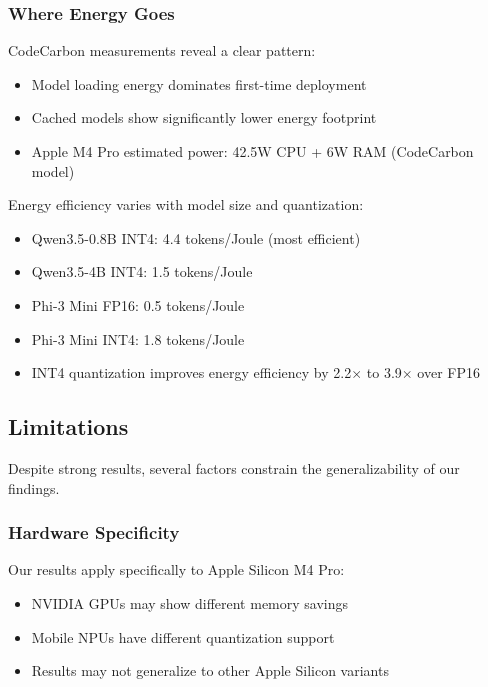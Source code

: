 \documentclass[conference]{IEEEtran}
\begin{document}
\subsubsection{Where Energy Goes}

CodeCarbon measurements reveal a clear pattern:

\begin{itemize}[leftmargin=*,nosep]
    \item Model loading energy dominates first-time deployment
    \item Cached models show significantly lower energy footprint
    \item Apple M4 Pro estimated power: 42.5W CPU + 6W RAM (CodeCarbon model)
\end{itemize}

Energy efficiency varies with model size and quantization:
\begin{itemize}[leftmargin=*,nosep]
    \item Qwen3.5-0.8B INT4: 4.4 tokens/Joule (most efficient)
    \item Qwen3.5-4B INT4: 1.5 tokens/Joule
    \item Phi-3 Mini FP16: 0.5 tokens/Joule
    \item Phi-3 Mini INT4: 1.8 tokens/Joule
    \item INT4 quantization improves energy efficiency by 2.2$\times$ to 3.9$\times$ over FP16
\end{itemize}

\subsection{Limitations}

Despite strong results, several factors constrain the generalizability of our findings.

\subsubsection{Hardware Specificity}

Our results apply specifically to Apple Silicon M4 Pro:

\begin{itemize}[leftmargin=*,nosep]
    \item NVIDIA GPUs may show different memory savings
    \item Mobile NPUs have different quantization support
    \item Results may not generalize to other Apple Silicon variants
\end{itemize}
\end{document}
